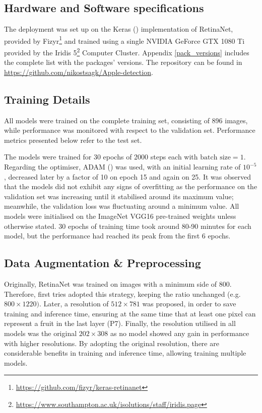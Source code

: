 \subsection{Hardware and Software specifications}
The deployment was set up on the Keras (\cite{chollet2015keras}) implementation of RetinaNet, provided by Fizyr\footnote{\url{https://github.com/fizyr/keras-retinanet}} and trained using a single NVIDIA GeForce GTX 1080 Ti provided by the Iridis 5\footnote{\url{https://www.southampton.ac.uk/isolutions/staff/iridis.page}} Computer Cluster. Appendix \ref{pack_versions} includes the complete list with the packages' versions. The repository can be found in \url{https://github.com/nikostsagk/Apple-detection}.

\subsection{Training Details}\label{training_details}
All models were trained on the complete training set, consisting of 896 images, while performance was monitored with respect to the validation set. Performance metrics presented below refer to the test set.

The models were trained for 30 epochs of 2000 steps each with $\text{batch size} = 1$. Regarding the optimiser, ADAM (\cite{kingma2014adam}) was used, with an initial learning rate of $10^{-5}$, decreased later by a factor of 10 on epoch 15 and again on 25. It was observed that the models did not exhibit any signs of overfitting as the performance on the validation set was increasing until it stabilised around its maximum value; meanwhile, the validation loss was fluctuating around a minimum value. All models were initialised on the ImageNet VGG16 pre-trained weights unless otherwise stated. 30 epochs of training time took around 80-90 minutes for each model, but the performance had reached its peak from the first 6 epochs.

\subsection{Data Augmentation \& Preprocessing}
Originally, RetinaNet was trained on images with a minimum side of 800. Therefore, first tries adopted this strategy, keeping the ratio unchanged (e.g. $800\times1220)$. Later, a resolution of $512\times781$ was proposed, in order to save training and inference time, ensuring at the same time that at least one pixel can represent a fruit in the last layer (P7). Finally, the resolution utilised in all models was the original $202\times308$ as no model showed any gain in performance with higher resolutions. By adopting the original resolution, there are considerable benefits in training and inference time, allowing training multiple models.


